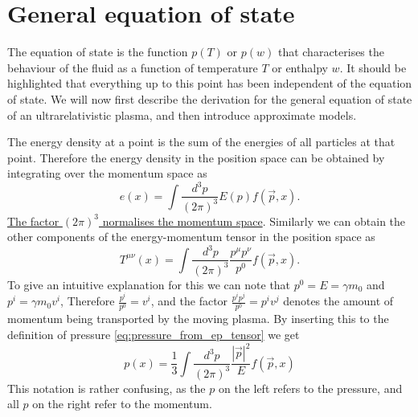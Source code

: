 \section{General equation of state}
\label{general_eq}
The equation of state is the function $p(T)$ or $p(w)$ that characterises the behaviour of the fluid as a function of temperature $T$ or enthalpy $w$.
It should be highlighted that everything up to this point has been independent of the equation of state.
We will now first describe the derivation for the general equation of state of an ultrarelativistic plasma,
and then introduce approximate models.

\iffalse
In general the pressure of the ultrarelativistic ASDF
\begin{equation}
p(T,\phi) = - \sum_B f_B (m(\phi),T) - \sum_F f_F (m(\phi),T)
\end{equation}
\fi

The energy density at a point is the sum of the energies of all particles at that point.
Therefore the energy density in the position space can be obtained by integrating over the momentum space as
\cite[eq. 4.10]{lecture_notes}
\begin{equation}
e(x) = \int \frac{d^3 p}{(2 \pi)^3} E(p) f(\vec{p}, x).
\end{equation}
\href{https://physics.stackexchange.com/a/141737/}{The factor $(2\pi)^3$ normalises the momentum space}.
Similarly we can obtain the other components of the energy-momentum tensor in the position space as
\cite[eq. 4.13]{lecture_notes}
\begin{equation}
T^{\mu \nu}(x) = \int \frac{d^3 p}{(2 \pi)^3} \frac{p^\mu p^\nu}{p^0} f(\vec{p},x).
\end{equation}
To give an intuitive explanation for this we can note that $p^0 = E = \gamma m_0$ and $p^i = \gamma m_0 v^i$,
Therefore $\frac{p^i}{p^0} = v^i$,
and the factor $\frac{p^i p^j}{p^0} = p^i v^j$ denotes the amount of momentum being transported by the moving plasma.
By inserting this to the definition of pressure \eqref{eq:pressure_from_ep_tensor} we get
\begin{equation}
p(x) = \frac{1}{3} \int \frac{d^3 p}{(2 \pi)^3} \frac{|\vec{p}|^2}{E} f(\vec{p},x)
\end{equation}
This notation is rather confusing, as the $p$ on the left refers to the pressure,
and all $p$ on the right refer to the momentum.

